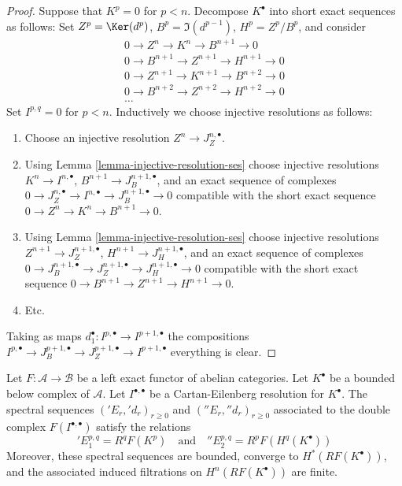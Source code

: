 \begin{proof}
Suppose that $K^p = 0$ for $p < n$. Decompose $K^\bullet$ into
short exact sequences as follows: Set $Z^p = \Ker(d^p)$,
$B^p = \Im(d^{p - 1})$, $H^p = Z^p/B^p$, and consider
$$
\begin{matrix}
0 \to Z^n \to K^n \to B^{n + 1} \to 0 \\
0 \to B^{n + 1} \to Z^{n + 1} \to H^{n + 1} \to 0 \\
0 \to Z^{n + 1} \to K^{n + 1} \to B^{n + 2} \to 0 \\
0 \to B^{n + 2} \to Z^{n + 2} \to H^{n + 2} \to 0 \\
\ldots
\end{matrix}
$$
Set $I^{p, q} = 0$ for $p < n$. Inductively we choose
injective resolutions as follows:
\begin{enumerate}
\item Choose an injective resolution $Z^n \to J_Z^{n, \bullet}$.
\item Using Lemma \ref{lemma-injective-resolution-ses} choose injective
resolutions $K^n \to I^{n, \bullet}$, $B^{n + 1} \to J_B^{n + 1, \bullet}$,
and an exact sequence of complexes
$0 \to J_Z^{n, \bullet} \to I^{n, \bullet} \to J_B^{n + 1, \bullet} \to 0$
compatible with the short exact sequence
$0 \to Z^n \to K^n \to B^{n + 1} \to 0$.
\item Using Lemma \ref{lemma-injective-resolution-ses} choose injective
resolutions $Z^{n + 1} \to J_Z^{n + 1, \bullet}$,
$H^{n + 1} \to J_H^{n + 1, \bullet}$,
and an exact sequence of complexes
$0 \to J_B^{n + 1, \bullet} \to J_Z^{n + 1, \bullet}
\to J_H^{n + 1, \bullet} \to 0$
compatible with the short exact sequence
$0 \to B^{n + 1} \to Z^{n + 1} \to H^{n + 1} \to 0$.
\item Etc.
\end{enumerate}
Taking as maps $d_1^\bullet : I^{p, \bullet} \to I^{p + 1, \bullet}$
the compositions
$I^{p, \bullet} \to J_B^{p + 1, \bullet} \to
J_Z^{p + 1, \bullet} \to I^{p + 1, \bullet}$ everything is clear.
\end{proof}

\begin{lemma}
\label{lemma-two-ss-complex-functor}
Let $F : \mathcal{A} \to \mathcal{B}$ be a left exact functor of
abelian categories.
Let $K^\bullet$ be a bounded below complex of $\mathcal{A}$.
Let $I^{\bullet, \bullet}$ be a Cartan-Eilenberg resolution
for $K^\bullet$. The spectral sequences
$({}'E_r, {}'d_r)_{r \geq 0}$ and $({}''E_r, {}''d_r)_{r \geq 0}$
associated to the double complex $F(I^{\bullet, \bullet})$
satisfy the relations
$$
{}'E_1^{p, q} = R^qF(K^p)
\quad
\text{and}
\quad
{}''E_2^{p, q} = R^pF(H^q(K^\bullet))
$$
Moreover, these spectral sequences are bounded, converge to
$H^*(RF(K^\bullet))$, and the associated induced filtrations on
$H^n(RF(K^\bullet))$ are finite.
\end{lemma}

